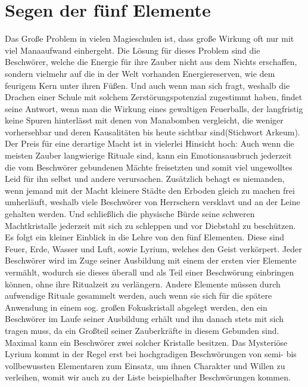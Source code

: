 \documentclass[a4paper,12pt,oneside]{book}
\begin{document}
\section{Segen der fünf Elemente}
Das Große Problem in vielen Magieschulen ist, dass große Wirkung oft nur mit viel Manaaufwand einhergeht. Die Lösung für dieses Problem sind die Beschwörer, welche die Energie für ihre Zauber nicht aus dem Nichts erschaffen, sondern vielmehr auf die in der Welt vorhanden Energiereserven, wie dem feurigem Kern unter ihren Füßen. Und auch wenn man sich fragt, weshalb die Drachen einer Schule mit solchem Zerstörungspotenzial zugestimmt haben, findet seine Antwort, wenn man die Wirkung eines gewaltigen Feuerballs, der langfristig keine Spuren hinterlässt mit denen von Manabomben vergleicht, die weniger vorhersehbar und deren Kausalitäten bis heute sichtbar sind(Stichwort Arkeum). Der Preis für eine derartige Macht ist in vielerlei Hinsicht hoch: Auch wenn die meisten Zauber langwierige Rituale sind, kann ein Emotionsausbruch jederzeit die vom Beschwörer gebundenen Mächte freisetzten und somit viel ungewolltes Leid für ihn selbst und andere verursachen. Zusätzlich behagt es niemanden, wenn jemand mit der Macht kleinere Städte den Erboden gleich zu machen frei umherläuft, weshalb viele Beschwörer von Herrschern versklavt und an der Leine gehalten werden. Und schließlich die physische Bürde seine schweren Machtkristalle jederzeit mit sich zu schleppen und vor Diebstahl zu beschützen.
\\Es folgt ein kleiner Einblick in die Lehre von den fünf Elementen. Diese sind Feuer, Erde, Wasser und Luft, sowie Lyrium, welches den Geist verkörpert. Jeder Beschwörer wird im Zuge seiner Ausbildung mit einem der ersten vier Elemente vermählt, wodurch sie dieses überall und als Teil einer Beschwörung einbringen können, ohne ihre Ritualzeit zu verlängern. Andere Elemente müssen durch aufwendige Rituale gesammelt werden, auch wenn sie sich für die spätere Anwendung in einem sog. großen Fokuskristall abgelegt werden, den ein Beschwörer im Laufe seiner Ausbildung erhält und ihn danach stets mit sich tragen muss, da ein Großteil seiner Zauberkräfte in diesem Gebunden sind. Maximal kann ein Beschwörer zwei solcher Kristalle besitzen. Das Mysteriöse Lyrium kommt in der Regel erst bei hochgradigen Beschwörungen von semi- bis vollbewussten Elementaren zum Einsatz, um ihnen Charakter und Willen zu verleihen, womit wir auch zu der Liste beispielhafter Beschwörungen kommen.
\end{document}
